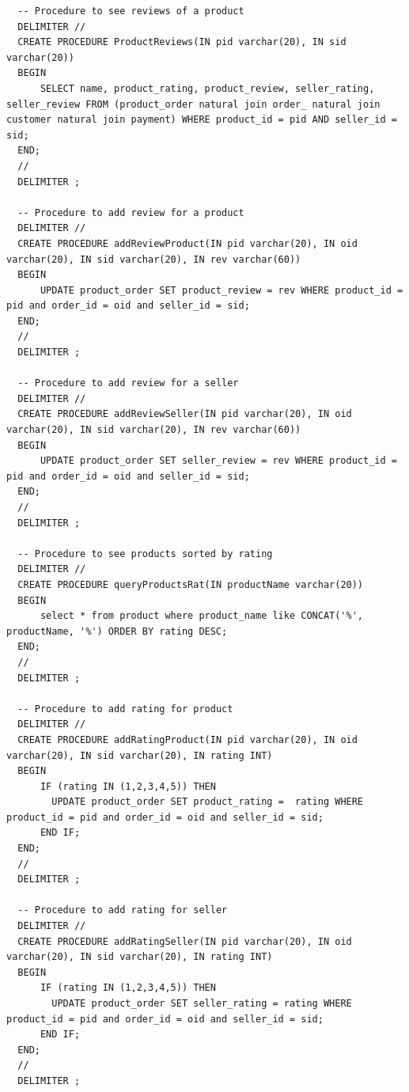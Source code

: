 \documentclass[a4paper,12pt]{article}
\begin{document}
\begin{verbatim}
  -- Procedure to see reviews of a product
  DELIMITER //
  CREATE PROCEDURE ProductReviews(IN pid varchar(20), IN sid varchar(20))
  BEGIN
      SELECT name, product_rating, product_review, seller_rating, seller_review FROM (product_order natural join order_ natural join customer natural join payment) WHERE product_id = pid AND seller_id = sid;
  END;
  //
  DELIMITER ;
  
  -- Procedure to add review for a product
  DELIMITER //
  CREATE PROCEDURE addReviewProduct(IN pid varchar(20), IN oid varchar(20), IN sid varchar(20), IN rev varchar(60))
  BEGIN
      UPDATE product_order SET product_review = rev WHERE product_id = pid and order_id = oid and seller_id = sid;
  END;
  //
  DELIMITER ;
  
  -- Procedure to add review for a seller 
  DELIMITER //
  CREATE PROCEDURE addReviewSeller(IN pid varchar(20), IN oid varchar(20), IN sid varchar(20), IN rev varchar(60))
  BEGIN
      UPDATE product_order SET seller_review = rev WHERE product_id = pid and order_id = oid and seller_id = sid;
  END;
  //
  DELIMITER ;
  
  -- Procedure to see products sorted by rating
  DELIMITER //
  CREATE PROCEDURE queryProductsRat(IN productName varchar(20))
  BEGIN
      select * from product where product_name like CONCAT('%', productName, '%') ORDER BY rating DESC;
  END;
  //
  DELIMITER ;
  
  -- Procedure to add rating for product
  DELIMITER //
  CREATE PROCEDURE addRatingProduct(IN pid varchar(20), IN oid varchar(20), IN sid varchar(20), IN rating INT)
  BEGIN
      IF (rating IN (1,2,3,4,5)) THEN
        UPDATE product_order SET product_rating =  rating WHERE product_id = pid and order_id = oid and seller_id = sid;
      END IF;
  END;
  //
  DELIMITER ;
  
  -- Procedure to add rating for seller
  DELIMITER //
  CREATE PROCEDURE addRatingSeller(IN pid varchar(20), IN oid varchar(20), IN sid varchar(20), IN rating INT)
  BEGIN
      IF (rating IN (1,2,3,4,5)) THEN
        UPDATE product_order SET seller_rating = rating WHERE product_id = pid and order_id = oid and seller_id = sid;
      END IF;
  END;
  //
  DELIMITER ;
  

\end{verbatim}
\end{document}

